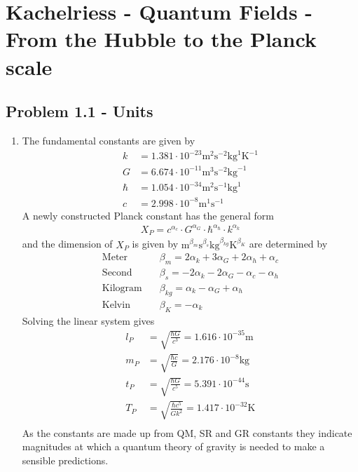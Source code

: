 \documentclass[../main.tex]{subfiles}
\begin{document}
\section{{\sc Kachelriess} - Quantum Fields - From the Hubble to the Planck scale}
\subsection{Problem 1.1 - Units}
\begin{enumerate}
\item The fundamental constants are given by
\begin{align}
    k    &=1.381\cdot10^{-23} \text{m}^2\text{s}^{-2}\text{kg}^{ 1}\text{K}^{-1}\\
    G    &=6.674\cdot10^{-11} \text{m}^3\text{s}^{-2}\text{kg}^{-1}\\
    \hbar&=1.054\cdot10^{-34} \text{m}^2\text{s}^{-1}\text{kg}^{ 1}\\
    c    &=2.998\cdot10^{-8}  \text{m}^1\text{s}^{-1}
\end{align}
A newly constructed Planck constant has the general form
\begin{align}
    X_P=c^{\alpha_c}\cdot G^{\alpha_G}\cdot \hbar^{\alpha_\hbar}\cdot k^{\alpha_k}
\end{align}
and the dimension of $X_P$ is given by $\text{m}^{\beta_m}\text{s}^{\beta_s}\text{kg}^{\beta_{kg}}\text{K}^{\beta_K}$ are determined by
\begin{align}
    \text{Meter}\quad    &\beta_m=2\alpha_k+3\alpha_G+2\alpha_h+\alpha_c\\
    \text{Second}\quad   &\beta_s=-2\alpha_k-2\alpha_G-\alpha_c-\alpha_h\\
    \text{Kilogram}\quad &\beta_{kg}=\alpha_k-\alpha_G+\alpha_h\\
    \text{Kelvin}\quad   &\beta_K=-\alpha_k
\end{align}
Solving the linear system gives
\begin{align}
    l_P&=\sqrt{\frac{\hbar G}{c^3}}=1.616\cdot 10^{-35}\text{m}\\
    m_P&=\sqrt{\frac{\hbar c}{G}}=2.176\cdot 10^{-8}\text{kg}\\
    t_P&=\sqrt{\frac{\hbar G}{c^5}}=5.391\cdot 10^{-44}\text{s}\\
    T_P&=\sqrt{\frac{\hbar c^5}{Gk^2}}=1.417\cdot 10^{-32}\text{K}\\
\end{align}
As the constants are made up from QM, SR and GR constants they indicate magnitudes at which a quantum theory of gravity is needed to make a sensible predictions.


\end{enumerate}
\end{document}
